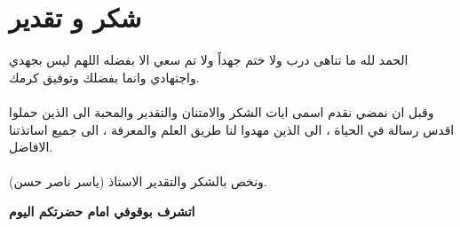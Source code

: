 \chapter*{شكر و تقدير}

الحمد لله ما تناهى درب ولا ختم جهداً ولا تم سعي الا بفضله اللهم ليس بجهدي واجتهادي وانما بفضلك وتوفيق كرمك.\\ \\
\noindent
وقبل ان نمضي نقدم اسمى ايات الشكر والامتنان والتقدير والمحبة الى الذين حملوا اقدس رسالة في الحياة ، الى الذين مهدوا لنا طريق العلم والمعرفة ، الى جميع اساتذتنا الافاضل. \\ \\
\noindent
ونخص بالشكر والتقدير الاستاذ (ياسر ناصر حسن).\\
\begin{center}
	\textbf{اتشرف بوقوفي امام حضرتكم اليوم}
\end{center}
